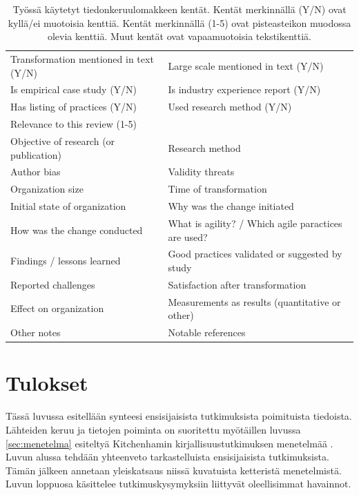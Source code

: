 \begin{table}
    \begin{tabular}{| l | p{7.64cm} |}
        \hline
        Transformation mentioned in text (Y/N) &
        Large scale mentioned in text (Y/N) \\
        Is empirical case study (Y/N) &
        Is industry experience report (Y/N) \\
        Has listing of practices (Y/N) &
        Used research method (Y/N) \\
        Relevance to this review (1-5) & \\
        Objective of research (or publication) &
        Research method \\
        Author bias &
        Validity threats \\
        Organization size &
        Time of transformation \\
        Initial state of organization &
        Why was the change initiated \\
        How was the change conducted &
        What is agility? / Which agile paractices are used? \\
        Findings / lessons learned &
        Good practices validated or suggested by study \\
        Reported challenges &
        Satisfaction after transformation \\
        Effect on organization &
        Measurements as results (quantitative or other) \\
        Other notes &
        Notable references \\
        \hline
    \end{tabular}
    \caption{Työssä käytetyt tiedonkeruulomakkeen kentät. Kentät merkinnällä
    (Y/N) ovat kyllä/ei muotoisia kenttiä. Kentät merkinnällä (1-5) ovat
    pisteasteikon muodossa olevia kenttiä. Muut kentät ovat vapaamuotoisia
    tekstikenttiä.}
    \label{table:dataform}
\end{table}


\clearpage
\section{Tulokset}
\label{sec:tulokset}

Tässä luvussa esitellään synteesi ensisijaisista tutkimuksista poimituista
tiedoista. Lähteiden keruu ja tietojen poiminta on suoritettu myötäillen luvussa
\ref{sec:menetelma} esiteltyä Kitchenhamin kirjallisuustutkimuksen menetelmää
. Luvun alussa tehdään yhteenveto tarkastelluista
ensisijaisista tutkimuksista. Tämän jälkeen annetaan yleiskatsaus niissä
kuvatuista ketteristä menetelmistä. Luvun loppuosa käsittelee
tutkimuskysymyksiin liittyvät oleellisimmat havainnot.


